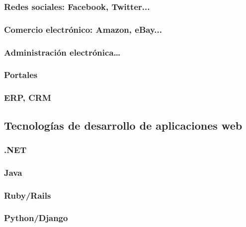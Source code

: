 \documentclass[a4paper,11pt,spanish]{sphinxmanual}
\begin{document}
\subsubsection{Redes sociales: Facebook, Twitter...}
\label{\detokenize{contenidos:id9}}

\subsubsection{Comercio electrónico: Amazon, eBay...}
\label{\detokenize{contenidos:id10}}

\subsubsection{Administración electrónica…}
\label{\detokenize{contenidos:id11}}

\subsubsection{Portales}
\label{\detokenize{contenidos:id12}}

\subsubsection{ERP, CRM}
\label{\detokenize{contenidos:id13}}

\subsection{Tecnologías de desarrollo de aplicaciones web}
\label{\detokenize{contenidos:id14}}

\subsubsection{.NET}
\label{\detokenize{contenidos:id15}}

\subsubsection{Java}
\label{\detokenize{contenidos:id16}}

\subsubsection{Ruby/Rails}
\label{\detokenize{contenidos:id17}}

\subsubsection{Python/Django}
\label{\detokenize{contenidos:id18}}
\end{document}
